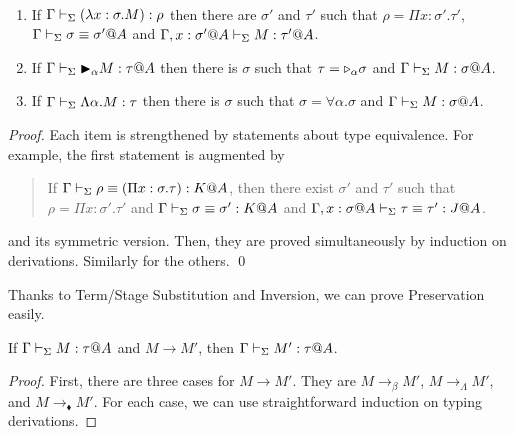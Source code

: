 \begin{lemma}[Inversion]\ 
	\begin{enumerate}
		\item If $\Gamma \vdash_\Sigma (\lambda x:\sigma.M) : \rho$ then there are $\sigma'$ and $\tau'$ such that
		      $\rho = \Pi x:\sigma'.\tau'$, $\Gamma \vdash_\Sigma \sigma \equiv \sigma'@A$ and $\Gamma ,x:\sigma'@A\vdash_\Sigma M:\tau'@A$.
		\item If $\G \V \TB_\alpha M : \tau@A$ then 
		      there is $\sigma$ such that $\tau = {\mathop{\triangleright}}_\alpha \sigma$ and $\G \V M : \sigma@A$.
		  \item If $\Gamma \vdash_\Sigma \Lambda\alpha.M : \tau$ then 
		  there is $\sigma$ such that $\sigma = \forall\alpha.\sigma$ and $\G \V M : \sigma@A$.%
	\end{enumerate}
\end{lemma}

\begin{proof}
  Each item is strengthened by statements about type equivalence.
  For example, the first statement is augmented by
  \begin{quotation}
    If $\Gamma \vdash_\Sigma \rho \equiv (\Pi x:\sigma.\tau) : K @A$, then there exist
    $\sigma'$ and $\tau'$ such that $\rho = \Pi x:\sigma'.\tau'$ and
    $\Gamma \vdash_\Sigma \sigma \equiv \sigma' : K @A$ and
    $\G, x:\sigma@A\V \tau \E \tau' : J @A$.
  \end{quotation}
  and its symmetric version.  Then, they are proved simultaneously by induction on derivations.
  Similarly for the others.
 \qed
\end{proof}



Thanks to Term/Stage Substitution and Inversion, we can prove Preservation easily.

\begin{theorem}[Preservation]
	If $\Gamma\vdash_\Sigma M:\tau @A$ and $M \longrightarrow M'$, then $\Gamma\vdash_\Sigma M':\tau @A$.
\end{theorem}

\begin{proof}
	First, there are three cases for $M \longrightarrow M'$.
	They are $M \longrightarrow_\beta M'$, $M \longrightarrow_\Lambda M'$, and $M \longrightarrow_\blacklozenge M'$.
	For each case, we can use straightforward induction on typing derivations.
\end{proof}


